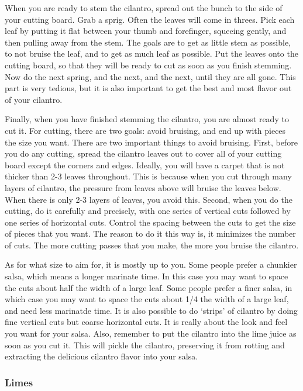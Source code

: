 When you are ready to stem the cilantro, spread out the bunch to the side of your cutting board. Grab a sprig. Often the leaves will come in threes. Pick each leaf by putting it flat between your thumb and forefinger, squeeing gently, and then pulling away from the stem. The goals are to get as little stem as possible, to not bruise the leaf, and to get as much leaf as possible. Put the leaves onto the cutting board, so that they will be ready to cut as soon as you finish stemming. Now do the next spring, and the next, and the next, until they are all gone. This part is very tedious, but it is also important to get the best and most flavor out of your cilantro.

Finally, when you have finished stemming the cilantro, you are almost ready to cut it. For cutting, there are two goals: avoid bruising, and end up with pieces the size you want. There are two important things to avoid bruising. First, before you do any cutting, spread the cilantro leaves out to cover all of your cutting board except the corners and edges. Ideally, you will have a carpet that is not thicker than 2-3 leaves throughout. This is because when you cut through many layers of cilantro, the pressure from leaves above will bruise the leaves below. When there is only 2-3 layers of leaves, you avoid this. Second, when you do the cutting, do it carefully and precisely, with one series of vertical cuts followed by one series of horizontal cuts. Control the spacing between the cuts to get the size of pieces that you want. The reason to do it this way is, it minimizes the number of cuts. The more cutting passes that you make, the more you bruise the cilantro. 

As for what size to aim for, it is mostly up to you. Some people prefer a chunkier salsa, which means a longer marinate time. In this case you may want to space the cuts about half the width of a large leaf. Some people prefer a finer salsa, in which case you may want to space the cuts about 1/4 the width of a large leaf, and need less marinatde time. It is also possible to do `strips' of cilantro by doing fine vertical cuts but coarse horizontal cuts. It is really about the look and feel you want for your salsa. Also, remember to put the cilantro into the lime juice as soon as you cut it. This will pickle the cilantro, preserving it from rotting and extracting the delicious cilantro flavor into your salsa.

\subsubsection{Limes}

